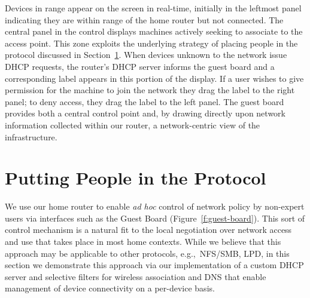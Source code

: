 Devices in range appear on the screen in real-time, initially in the leftmost
panel indicating they are within range of the home router but not connected.
The central panel in the control displays machines actively seeking to associate
to the access point. This zone exploits the underlying strategy of placing
people in the protocol discussed in Section~\ref{s:protocols}.  When devices
unknown to the network issue DHCP requests, the router's DHCP server informs the
guest board and a corresponding label appears in this portion of the display.
If a user wishes to give permission for the machine to join the network they
drag the label to the right panel; to deny access, they drag the label to the
left panel. The guest board provides both a central control point and, by
drawing directly upon network information collected within our router, a
network-centric view of the infrastructure. 



\section{Putting People in the Protocol} \label{s:protocols}

We use our home router to enable \emph{ad hoc} control of network policy by
non-expert users via interfaces such as the Guest Board
(Figure~\ref{f:guest-board}).  This sort of control mechanism is a natural fit
to the local negotiation over network access and use that takes place in most
home contexts.  While we believe that this approach may be applicable to other
protocols, e.g.,~NFS/SMB, LPD, in this section we demonstrate this approach via
our implementation of a custom DHCP server and selective filters for wireless
association and DNS that enable management of device connectivity on a
per-device basis. 

